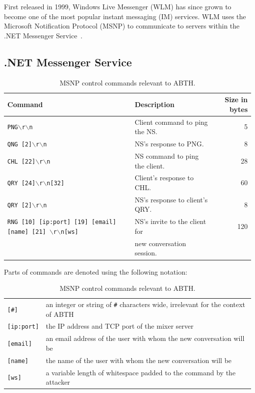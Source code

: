 \documentclass{sig-alternate}
\begin{document}
First released in 1999, Windows Live Messenger (WLM) has since grown to become one of the most popular instant messaging (IM) services.
WLM uses the Microsoft Notification Protocol (MSNP) to communicate to servers within the .NET Messenger Service~\cite{piccard:imsecurity}.

\subsection{.NET Messenger Service}

\begin{table}[tbp]
	\centering

	\caption {MSNP control commands relevant to ABTH.}
	\label{tab:commandlist}

	\begin{tabular}{llr}
		\hline
		\textbf{Command} & \textbf{Description} & \textbf{Size in bytes} \\
		\hline
		\hline
		\texttt{PNG$\backslash$r$\backslash$n} & Client command to ping the NS. & 5 \\
		\texttt{QNG [2]$\backslash$r$\backslash$n} & NS's response to PNG. & 8 \\
		\texttt{CHL [22]$\backslash$r$\backslash$n} & NS command to ping the client. & 28 \\
		\texttt{QRY [24]$\backslash$r$\backslash$n[32]} & Client's response to CHL. & 60 \\
		\texttt{QRY [2]$\backslash$r$\backslash$n} & NS's response to client's QRY. & 8 \\
		\texttt{RNG [10] [ip:port] [19] [email] [name] [21] $\backslash$r$\backslash$n[ws]} & NS's invite to the client for  & 120 \\
		& new conversation session. & \\
		\hline
	\end{tabular}

	\begin{flushleft}
	Parts of commands are denoted using the following notation:

	\begin{tabular}{ll}
		\texttt{[\#]}        & an integer or string of \texttt{\#} characters wide, irrelevant for the context of ABTH\\
		\texttt{[ip:port]} & the IP address and TCP port of the mixer server\\
		\texttt{[email]}  & an email address of the user with whom the new conversation will be\\
		\texttt{[name]} & the name of the user with whom the new conversation will be\\
		\texttt{[ws]}      & a variable length of whitespace padded to the command by the attacker\\
	\end{tabular}
	\end{flushleft}
\end{table}
\end{document}
